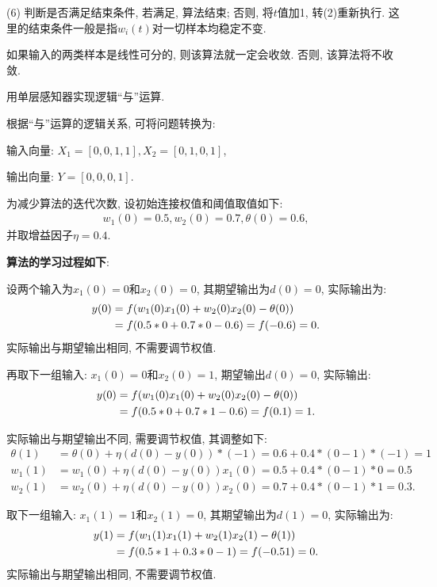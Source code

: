      (6) 判断是否满足结束条件, 若满足, 算法结束; 否则, 将$t$值加1, 转(2)重新执行. 这里的结束条件一般是指$w_i(t)$对一切样本均稳定不变.

    如果输入的两类样本是线性可分的, 则该算法就一定会收敛. 否则, 该算法将不收敛.
\begin{example}
  用单层感知器实现逻辑“与”运算.
\end{example}
\begin{result}
根据“与”运算的逻辑关系, 可将问题转换为:

输入向量: $X_1=[0, 0, 1, 1],X_2=[0, 1, 0, 1]$,

输出向量: $Y=[0, 0, 0, 1]$.

为减少算法的迭代次数, 设初始连接权值和阈值取值如下:
\begin{align}
    w_1(0)=0.5,   w_2(0)=0.7,   \theta(0)=0.6,
\end{align}
并取增益因子$\eta=0.4$.
\end{result}

\textbf{算法的学习过程如下}:

设两个输入为$x_1(0)=0$和$x_2(0)=0$, 其期望输出为$d(0)=0$, 实际输出为:
\begin{align}
y(0)&=f(w_1(0)x_1(0)+ w_2(0)x_2(0)-\theta(0))\notag\\
    &=f(0.5*0+0.7*0-0.6)=f(-0.6)=0.
\end{align}
实际输出与期望输出相同, 不需要调节权值.

再取下一组输入: $x_1(0)=0$和$x_2(0)=1$,  期望输出$d(0)=0$, 实际输出:
\begin{align}
y(0)&=f(w_1(0) x_1(0)+ w_2(0) x_2(0)-\theta(0))\notag\\
    &=f(0.5*0+0.7*1-0.6)=f(0.1)=1.
\end{align}

实际输出与期望输出不同, 需要调节权值, 其调整如下:
\begin{align}
\theta(1)&=\theta(0)+\eta (d(0)- y(0))*(-1)=0.6+0.4*(0-1)*(-1)=1\\
w_1(1)&=w_1(0)+\eta (d(0)- y(0))x_1(0)=0.5+0.4*(0-1)*0=0.5\\
w_2(1)&=w_2(0)+\eta (d(0)- y(0))x_2(0)=0.7+0.4*(0-1)*1=0.3.
\end{align}

取下一组输入: $x_1(1)=1$和$x_2(1)=0$, 其期望输出为$d(1)=0$, 实际输出为:
\begin{align}
y(1)&=f(w_1(1) x_1(1)+ w_2(1) x_2(1)-\theta(1))\notag\\
    &=f(0.5*1+0.3*0-1)=f(-0.51)=0.
\end{align}
实际输出与期望输出相同, 不需要调节权值.

